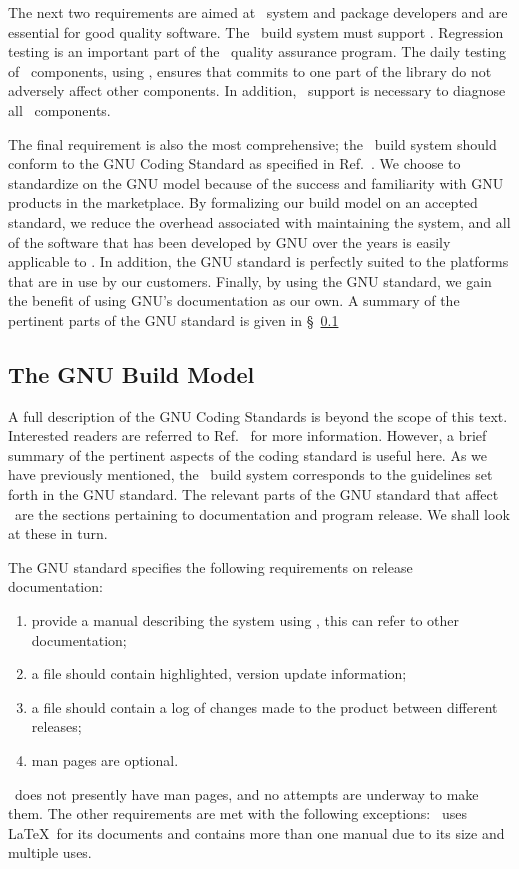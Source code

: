 The next two requirements are aimed at \draco\ system and package
developers and are essential for good quality software.  The \draco\ 
build system must support \dejagnu.  Regression testing is an
important part of the \draco\ quality assurance program.  The daily
testing of \draco\ components, using \dejagnu, ensures that commits to
one part of the library do not adversely affect other components.  In
addition, \purify\ support is necessary to diagnose all \draco\ 
components.

The final requirement is also the most comprehensive; the \draco\ 
build system should conform to the GNU Coding Standard as specified in
Ref.~\cite{gnu}.  We choose to standardize on the GNU model because of 
the success and familiarity with GNU products in the marketplace.  By
formalizing our build model on an accepted standard, we reduce the
overhead associated with maintaining the system, and all of the
software that has been developed by GNU over the years is easily
applicable to \draco.  In addition, the GNU standard is perfectly
suited to the platforms that are in use by our customers.  Finally, by 
using the GNU standard, we gain the benefit of using GNU's
documentation as our own.  A summary of the pertinent parts of the GNU 
standard is given in \S~\ref{sec:gnu_build_model}

\subsection{The GNU Build Model}
\label{sec:gnu_build_model}

A full description of the GNU Coding Standards is beyond the scope of
this text.  Interested readers are referred to Ref.~\cite{gnu} for
more information.  However, a brief summary of the pertinent aspects
of the coding standard is useful here.  As we have previously
mentioned, the \draco\ build system corresponds to the guidelines set
forth in the GNU standard.  The relevant parts of the GNU standard
that affect \draco\ are the sections pertaining to documentation and
program release.  We shall look at these in turn.

The GNU standard specifies the following requirements on release
documentation:
\begin{enumerate}
\item provide a manual describing the system using \soft{texinfo},
  this can refer to other documentation;
\item a  file should contain highlighted, version update
  information;
\item a \comp{ChangeLog} file should contain a log of changes made to
  the product between different releases;
\item man pages are optional.
\end{enumerate}
\draco\ does not presently have man pages, and no attempts are
underway to make them.  The other requirements are met with the
following exceptions: \draco\ uses \LaTeX\ for its documents and
contains more than one manual due to its size and multiple uses.

